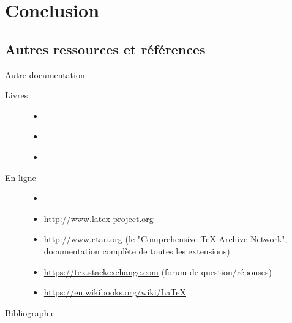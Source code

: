 \documentclass[usenames,dvipsnames]{beamer} %
\newcommand{\titlecite}[1] {
    \citetitle{#1}\cite{#1}
}
\begin{document}
\section{Conclusion}
\subsection{Autres ressources et références}
\begin{frame}{Autre documentation}
    \begin{description}
        \item[Livres]{
            \begin{itemize}
                \item \titlecite{lamport1994latex}
                \item \titlecite{goossens1997latex}
                \item \titlecite{rolland1999latex}
            \end{itemize}
        }
        \item[En ligne]{
            \begin{itemize}
                \item \titlecite{oetiker2011not}
                \item \url{http://www.latex-project.org}
                \item \url{http://www.ctan.org} (le "\textenglish{Comprehensive
                    \TeX{} Archive Network}", documentation complète de toutes
                    les extensions)
                \item \url{https://tex.stackexchange.com} (forum de
                    question/réponses)
                \item \url{https://en.wikibooks.org/wiki/LaTeX}
            \end{itemize}
        }
    \end{description}
\end{frame}
\begin{frame}[allowframebreaks]{Bibliographie}
    \printbibliography{}
\end{frame}
\end{document}
